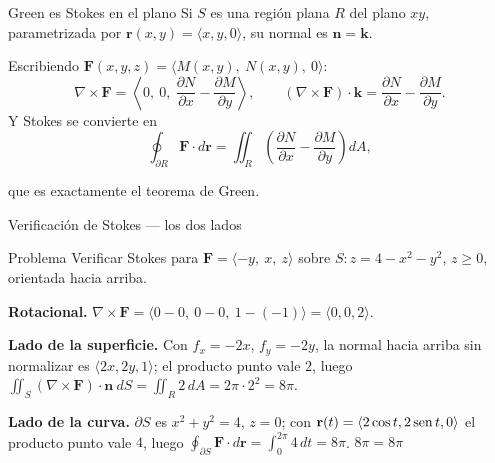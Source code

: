 \documentclass[11pt,aspectratio=169]{beamer}
\begin{document}
\begin{frame}{Green es Stokes en el plano}
  Si $S$ es una región plana $R$ del plano $xy$, parametrizada por $\mathbf r(x,y)=\langle x,y,0\rangle$, su normal es $\mathbf n=\mathbf k$.
  \pause
  \vspace{4pt}

  Escribiendo $\mathbf F(x,y,z)=\langle M(x,y),\ N(x,y),\ 0\rangle$:
  \[
    \nabla\times\mathbf F = \left\langle 0,\ 0,\ \frac{\partial N}{\partial x}-\frac{\partial M}{\partial y}\right\rangle,
    \qquad
    (\nabla\times\mathbf F)\cdot\mathbf k = \frac{\partial N}{\partial x}-\frac{\partial M}{\partial y}.
  \]
  \pause
  Y Stokes se convierte en
  \[
    \oint_{\partial R}\mathbf F\cdot d\mathbf r
    = \iint_R\left(\frac{\partial N}{\partial x}-\frac{\partial M}{\partial y}\right) dA,
  \]
  \pause
  \begin{center}
  \normalsize\color{tealx} que es exactamente el teorema de Green.
  \end{center}
\end{frame}

\begin{frame}{Verificación de Stokes --- los dos lados}
  \begin{block}{Problema}
    Verificar Stokes para $\mathbf F=\langle -y,\ x,\ z\rangle$ sobre $S: z=4-x^2-y^2$, $z\ge0$, orientada hacia arriba.
  \end{block}
  \pause
  \textbf{Rotacional.}\quad
  $\nabla\times\mathbf F = \langle 0-0,\ 0-0,\ 1-(-1)\rangle = \langle 0,0,2\rangle$.
  \pause
  \vspace{4pt}

  \textbf{Lado de la superficie.} Con $f_x=-2x$, $f_y=-2y$, la normal hacia arriba sin normalizar es $\langle 2x,2y,1\rangle$; el producto punto vale $2$, luego
  $\displaystyle\iint_S(\nabla\times\mathbf F)\cdot\mathbf n\ dS = \iint_R 2\,dA = 2\pi\cdot2^2 = 8\pi$.
  \pause
  \vspace{4pt}

  \textbf{Lado de la curva.} $\partial S$ es $x^2+y^2=4$, $z=0$; con $\mathbf r(t)=\langle2\cos t,2\operatorname{sen} t,0\rangle$ el producto punto vale $4$, luego
  $\displaystyle\oint_{\partial S}\mathbf F\cdot d\mathbf r = \int_0^{2\pi}4\,dt = 8\pi$. \quad$\boxed{8\pi=8\pi}$\ \checkmark
\end{frame}
\end{document}
